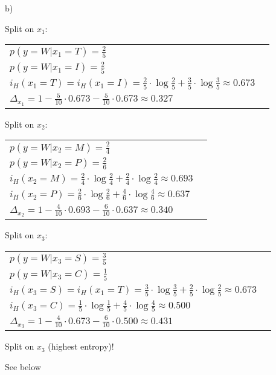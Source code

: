 \begin{flushleft}
  b) \\
  \begin{flushleft}
  Split on $x_1$:
  \begin{table}[!h]
  \begin{tabular}{ll}
    $p(y=W|x_1 = T) = \frac{2}{5}$ \\
    $p(y=W|x_1 = I) = \frac{2}{5}$ \\
    $i_H(x_1=T) = i_H(x_1 = I) = \frac{2}{5} \cdot \log \frac{2}{5} + \frac{3}{5} \cdot \log \frac{3}{5} \approx 0.673$ \\
    $\Delta_{x_1} = 1 - \frac{5}{10} \cdot 0.673 - \frac{5}{10} \cdot 0.673 \approx 0.327$
  \end{tabular}
  \end{table}
  \end{flushleft}
  \begin{flushleft}
  Split on $x_2$:
  \begin{table}[!h]
  \begin{tabular}{ll}
    $p(y=W|x_2 = M) = \frac{2}{4}$ \\
    $p(y=W|x_2 = P) = \frac{2}{6}$ \\
    $i_H(x_2 = M) = \frac{2}{4} \cdot \log \frac{2}{4} + \frac{2}{4} \cdot \log \frac{2}{4} \approx 0.693$ \\
    $i_H(x_2 = P) = \frac{2}{6} \cdot \log \frac{2}{6} + \frac{4}{6} \cdot \log \frac{4}{6} \approx 0.637$ \\
    $\Delta_{x_2} = 1 - \frac{4}{10} \cdot 0.693 - \frac{6}{10} \cdot 0.637 \approx 0.340$
  \end{tabular}
  \end{table}
  \end{flushleft}
  \newpage
  \begin{flushleft}
  Split on $x_3$:
  \begin{table}[!h]
  \begin{tabular}{ll}
    $p(y=W|x_3 = S) = \frac{3}{5}$ \\
    $p(y=W|x_3 = C) = \frac{1}{5}$ \\
    $i_H(x_3 = S) = i_H(x_1=T) = \frac{3}{5} \cdot \log \frac{3}{5} + \frac{2}{5} \cdot \log \frac{2}{5} \approx 0.673$ \\
    $i_H(x_3 = C) = \frac{1}{5} \cdot \log \frac{1}{5} + \frac{4}{5} \cdot \log \frac{4}{5} \approx 0.500$ \\
    $\Delta_{x_3} = 1 - \frac{4}{10} \cdot 0.673 - \frac{6}{10} \cdot 0.500 \approx 0.431$
  \end{tabular}
  \end{table}
  \end{flushleft}
  \begin{flushleft}
  Split on $x_3$ (highest entropy)!
  \end{flushleft}
\end{flushleft}
%
%
%
 See below
%

%



